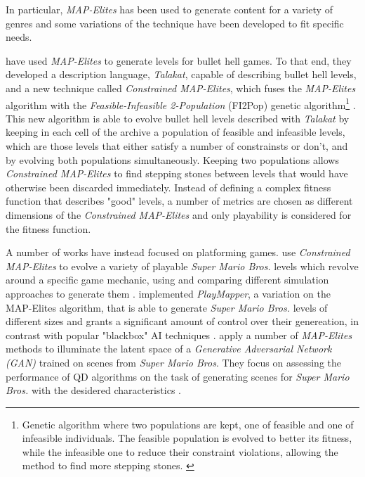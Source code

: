 \documentclass{Configuration_Files/PoliMi3i_thesis}
\begin{document}
In particular, \textit{MAP-Elites} has been used to generate content for a variety of genres and some variations of the technique have been developed to fit specific needs. 

\citeauthor{khalifa_talakat_2018} have used \textit{MAP-Elites} to generate levels for bullet hell games. To that end, they developed a description language, \textit{Talakat}, capable of describing bullet hell levels, and a new technique called \textit{Constrained MAP-Elites}, which fuses the \textit{MAP-Elites} algorithm with the \textit{Feasible-Infeasible 2-Population} (FI2Pop) genetic algorithm\footnote{Genetic algorithm where two populations are kept, one of feasible and one of infeasible individuals. The feasible population is evolved to better its fitness, while the infeasible one to reduce their constraint violations, allowing the method to find more stepping stones. \cite{kimbrough_feasibleinfeasible_2008}} \cite{kimbrough_feasibleinfeasible_2008}. This new algorithm is able to evolve bullet hell levels described with \textit{Talakat} by keeping in each cell of the archive a population of feasible and infeasible levels, which are those levels that either satisfy a number of constrainsts or don't, and by evolving both populations simultaneously. Keeping two populations allows \textit{Constrained MAP-Elites} to find stepping stones between levels that would have otherwise been discarded immediately. Instead of defining a complex fitness function that describes "good" levels, a number of metrics are chosen as different dimensions of the \textit{Constrained MAP-Elites} and only playability is considered for the fitness function. \cite{khalifa_talakat_2018}

A number of works have instead focused on platforming games.  use \textit{Constrained MAP-Elites} to evolve a variety of playable \textit{Super Mario Bros.} levels which revolve around a specific game mechanic, using and comparing different simulation approaches to generate them \cite{khalifa_intentional_2019}.  implemented \textit{PlayMapper}, a variation on the MAP-Elites algorithm, that is able to generate \textit{Super Mario Bros.} levels of different sizes and grants a significant amount of control over their genereation, in contrast with popular "blackbox" AI techniques \cite{warriar_playmapper_2019}. \citeauthor{fontaine_illuminating_2021} apply a number of \textit{MAP-Elites} methods to illuminate the latent space of a \textit{Generative Adversarial Network (GAN)} trained on scenes from \textit{Super Mario Bros}. They focus on assessing the performance of QD algorithms on the task of generating scenes for \textit{Super Mario Bros.} with the desidered characteristics \cite{fontaine_illuminating_2021}.
\end{document}
